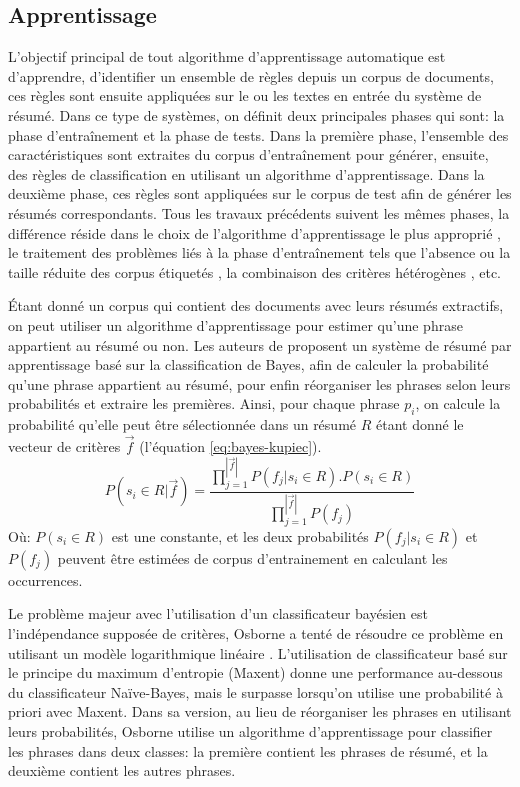 \documentclass[a4paper,12pt,oneside]{../use/ESIthesis}
\begin{document}
\subsection{Apprentissage}
\label{sec:appentissage}

L'objectif principal de tout algorithme d'apprentissage automatique est d'apprendre, d'identifier un ensemble de règles depuis un corpus de documents, ces règles sont ensuite appliquées sur le ou les textes en entrée du système de résumé. 
Dans ce type de systèmes, on définit deux principales phases  qui sont:  la phase d'entraînement et la phase de tests. 
Dans la première phase, l'ensemble des caractéristiques sont extraites du corpus d'entraînement pour générer, ensuite, des règles de classification en utilisant un algorithme d'apprentissage.
Dans la deuxième phase, ces règles sont appliquées sur le corpus de test afin de générer les résumés correspondants. 
Tous les travaux précédents suivent les mêmes phases, la différence réside dans le choix de l'algorithme d'apprentissage le plus approprié \cite{95-kupiec-al,02-osborne,05-yeh-al}, le traitement des problèmes liés à la phase d'entraînement tels que l'absence ou la taille réduite des corpus étiquetés \cite{01-amini-gallinari}, la combinaison des critères hétérogènes \cite{08-wong-al,10-yatsko-al}, etc. 

Étant donné un corpus qui contient des documents avec leurs résumés extractifs, on peut utiliser un algorithme d'apprentissage pour estimer qu'une phrase appartient au résumé ou non. 
Les auteurs de \cite{95-kupiec-al} proposent un système de résumé par apprentissage basé sur la classification de Bayes, afin de calculer la probabilité qu'une phrase appartient au résumé, pour enfin réorganiser les phrases selon leurs probabilités et extraire les premières. 
Ainsi, pour chaque phrase $ p_i $, on calcule la probabilité qu'elle peut être sélectionnée dans un résumé $ R $ étant donné le vecteur de critères $ \overrightarrow{f} $ (l'équation \ref{eq:bayes-kupiec}).
\begin{equation}
\label{eq:bayes-kupiec}
P(s_i \in R | \overrightarrow{f}) = %
\frac{\prod_{j = 1}^{|\overrightarrow{f}|} P(f_j | s_i \in R) . P(s_i \in R)}
{\prod_{j = 1}^{|\overrightarrow{f}|} P(f_j)}
\end{equation}
Où: 
$ P(s_i \in R) $ est une constante, et les deux probabilités $ P(f_j | s_i \in R) $ et $ P(f_j) $ peuvent être estimées de corpus d'entrainement en calculant les occurrences.

Le problème majeur avec l'utilisation d'un classificateur bayésien est l'indépendance supposée de critères, Osborne a tenté de résoudre ce problème en utilisant un modèle logarithmique linéaire \cite{02-osborne}. 
L'utilisation de classificateur basé sur le principe du maximum d'entropie (Maxent) donne une performance au-dessous du classificateur Na\"ive-Bayes, mais le surpasse lorsqu'on utilise une probabilité à priori avec Maxent. 
Dans sa version, au lieu de réorganiser les phrases en utilisant leurs probabilités, Osborne utilise un algorithme d'apprentissage pour classifier les phrases dans deux classes: la première contient les phrases de résumé, et la deuxième contient les autres phrases. 
\end{document}
